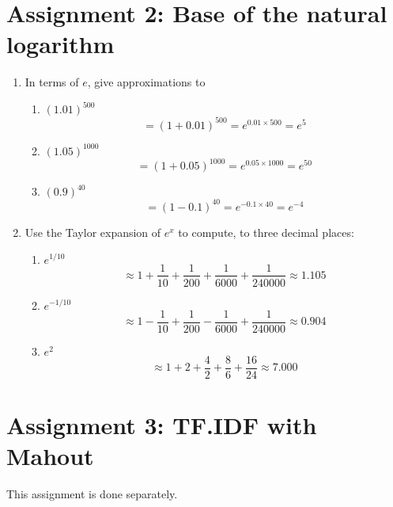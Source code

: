 \documentclass{article}
\begin{document}
\section{Assignment 2: Base of the natural logarithm}
\begin{enumerate}
\item{In terms of $e$, give approximations to
\begin{enumerate}
\item{$(1.01)^{500}$
\[ = (1 + 0.01)^{500} = e^{0.01 \times 500} = e^5 \]}
\item{$(1.05)^{1000}$
\[ = (1 + 0.05)^{1000} = e^{0.05 \times 1000} = e^{50} \]}
\item{$(0.9)^{40}$
\[ = (1 - 0.1)^{40} = e^{-0.1 \times 40} = e^{-4} \]}
\end{enumerate}
}
\item{Use the Taylor expansion of $e^x$ to compute, to three decimal places:
\begin{enumerate}
\item{$e^{1/10}$
\[ \approx 1 + \frac{1}{10} + \frac{1}{200} + \frac{1}{6000} + \frac{1}{240000} \approx 1.105 \]
}
\item{$e^{-1/10}$
\[ \approx 1 - \frac{1}{10} + \frac{1}{200} - \frac{1}{6000} + \frac{1}{240000} \approx 0.904 \]
}
\item{$e^2$
\[ \approx 1 + 2 + \frac{4}{2} + \frac{8}{6} + \frac{16}{24} \approx 7.000 \]
}
\end{enumerate}
}
\end{enumerate}

\section{Assignment 3: TF.IDF with Mahout}
This assignment is done separately.
\end{document}

